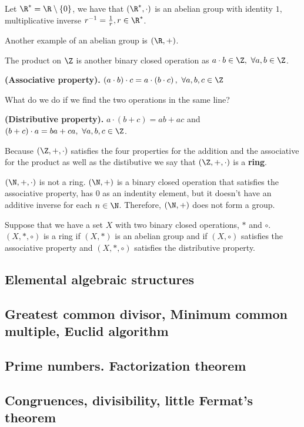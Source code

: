 \begin{example}
    Let $\R^* = \R\setminus \{0\} $, we have that $\left( \R^*, \cdot \right) $ is an abelian group with identity $1$, multiplicative inverse $r^{-1} = \frac{1}{r}, r\in\R^*$.

    Another example of an abelian group is $\left( \R, + \right) $.
\end{example}

The product on $\Z$ is another binary closed operation as $a\cdot b\in\Z,\ \forall a, b\in\Z$.

\begin{proposition}
    \textbf{(Associative property).} $\left( a \cdot b \right) \cdot c = a \cdot \left( b \cdot c \right) ,\ \forall a, b, c\in\Z$
\end{proposition}

What do we do if we find the two operations in the same line?

\begin{proposition}
    \textbf{(Distributive property).} $a\cdot\left( b + c \right) = ab + ac$ and $\left( b + c \right)\cdot a = ba + ca,\ \forall a, b, c\in\Z $.
\end{proposition}

Because $\left( \Z, +, \cdot \right) $ satisfies the four properties for the addition and the associative for the product as well as the distibutive we say that $\left( \Z, +, \cdot \right) $ is a \textbf{ring}.

\begin{example}
    $\left( \N, +, \cdot \right) $ is not a ring. $\left( \N, + \right) $ is a binary closed operation that satisfies the associative property, has $0$ as an indentity element, but it doesn't have an additive inverse for each $n\in\N$. Therefore, $\left( \N, + \right) $ does not form a group.
\end{example}

Suppose that we have a set $X$ with two binary closed operations, $*$ and $\circ$. $\left(X, *, \circ  \right) $ is a ring if $\left( X, * \right) $ is an abelian group and if $\left( X, \circ \right) $ satisfies the associative property and $\left( X, *, \circ \right) $ satisfies the distributive property.

\subsection{Elemental algebraic structures}
\subsection{Greatest common divisor, Minimum common multiple, Euclid algorithm}
\subsection{Prime numbers. Factorization theorem}
\subsection{Congruences, divisibility, little Fermat's theorem}
